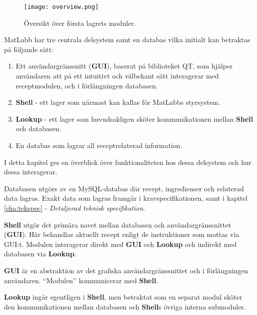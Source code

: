 
\begin{figure}[h]
\centering
\texttt{[image: overview.png]}
\caption{Översikt över första lagrets moduler.}
\label{fig:overview}
\end{figure}

MatLabb har tre centrala delsystem samt en databas vilka initialt kan betraktas på följande sätt: 
\begin{enumerate}
  \item Ett användargränssnitt (\textbf{GUI}), baserat på biblioteket QT, som hjälper användaren att på ett intuitivt och välbekant sätt interagerar med receptmodulen, och i förlängningen databasen.
  \item \textbf{Shell} - ett lager som närmast kan kallas för MatLabbs styrsystem.
  \item \textbf{Lookup} - ett lager som huvudsakligen sköter kommunikationen mellan \textbf{Shell} och databasen. 
  \item En databas som lagrar all receptrelaterad information.
\end{enumerate}
I detta kapitel ges en överblick över funktionaliteten hos dessa delsystem och hur dessa interagerar.

Databasen utgörs av en MySQL-databas där recept, ingredienser och relaterad data lagras. Exakt data som lagras framgår i kravspecifikationen, samt i kapitel \ref{cha:tekspec} - \emph{Detaljerad teknisk specifikation}.

\textbf{Shell} utgör det primära navet mellan databasen och användargränssnittet (\textbf{GUI}). Här behandlas aktuellt recept enligt de instruktioner som mottas via GUI:t. Modulen interagerar direkt med \textbf{GUI} och \textbf{Lookup} och indirekt med databasen via \textbf{Lookup}.

\textbf{GUI} är en abstraktion av det grafiska användargränssnittet och i förlängningen användaren. ``Modulen'' kommunicerar med \textbf{Shell}.

\textbf{Lookup} ingår egentligen i \textbf{Shell}, men betraktat som en separat modul sköter den kommunikationen mellan databasen och \textbf{Shell}s övriga interna submoduler.
